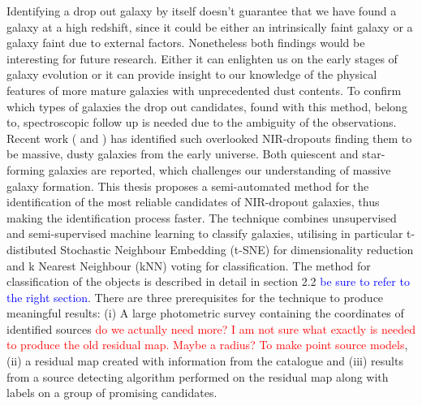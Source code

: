 Identifying a drop out galaxy by itself doesn't guarantee that we have found a galaxy at a high redshift, since it could be either an intrinsically faint galaxy or a galaxy faint due to external factors. Nonetheless both findings would be interesting for future research. Either it can enlighten us on the early stages of galaxy evolution or it can provide insight to our knowledge of the physical features of more mature galaxies with unprecedented dust contents. To confirm which types of galaxies the drop out candidates, found with this method, belong to, spectroscopic follow up is needed due to the ambiguity of the observations. \\

Recent work (\cite{Alcalde_Pampliega_2019} and \cite{Wang_2019}) has identified such overlooked NIR-dropouts finding them to be massive, dusty galaxies from the early universe. Both quiescent and star-forming galaxies are reported, which challenges our understanding of massive galaxy formation. This thesis proposes a semi-automated method for the identification of the most reliable candidates of NIR-dropout galaxies, thus making the identification process faster. The technique combines unsupervised and semi-supervised machine learning to classify galaxies, utilising in particular t-distibuted Stochastic Neighbour Embedding (t-SNE) for dimensionality reduction and k Nearest Neighbour (kNN) voting for classification. The method for classification of the objects is described in detail in section 2.2 \textcolor{blue}{be sure to refer to the right section}. There are three prerequisites for the technique to produce meaningful results: (i) A large photometric survey containing the coordinates of identified sources \textcolor{red}{do we actually need more? I am not sure what exactly is needed to produce the old residual map. Maybe a radius? To make point source models}, (ii) a residual map created with information from the catalogue and (iii) results from a source detecting algorithm performed on the residual map along with labels on a group of promising candidates. \\

